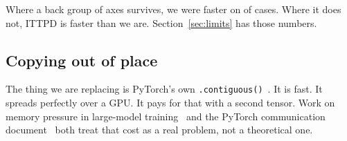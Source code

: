 Where a back group of axes survives, we were faster on \resWinIttpd{} of
\resWinIttpdOf{} cases. Where it does not, ITTPD is faster than we are.
Section~\ref{sec:limits} has those numbers.

\subsection{Copying out of place}

The thing we are replacing is PyTorch's own
\texttt{.contiguous()}~\cite{pytorch_contiguous_2016,pytorch_2x}. It is fast. It
spreads perfectly over a GPU. It pays for that with a second tensor. Work on
memory pressure in large-model training~\cite{rajbhandari2020zero} and the
PyTorch communication document~\cite{pytorch_rfc_comms_2026} both treat that
cost as a real problem, not a theoretical one.
